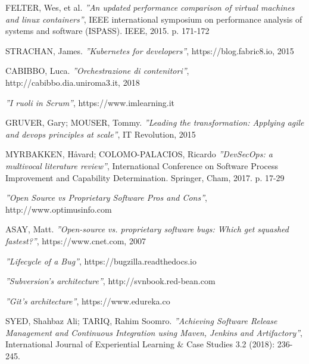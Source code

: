 \documentclass[a4paper, 12pt]{report}
\numberwithin{equation}{section}
\begin{document}
\begin{thebibliography}{9}
        FELTER, Wes, et al.
            \emph{''An updated performance comparison of virtual machines and linux containers''},
            IEEE international symposium on performance analysis of systems and software (ISPASS). IEEE, 2015. p. 171-172
            
        STRACHAN, James.
            \emph{''Kubernetes for developers''},
            https://blog.fabric8.io, 2015
            
        CABIBBO, Luca.
            \emph{''Orchestrazione di contenitori''},
            http://cabibbo.dia.uniroma3.it, 2018
            
            \emph{''I ruoli in Scrum''},
            https://www.imlearning.it
            
        GRUVER, Gary; MOUSER, Tommy.
            \emph{''Leading the transformation: Applying agile and devops principles at scale''},
            IT Revolution, 2015
            
        MYRBAKKEN, Håvard; COLOMO-PALACIOS, Ricardo
            \emph{''DevSecOps: a multivocal literature review''},
            International Conference on Software Process Improvement and Capability Determination. Springer, Cham, 2017. p. 17-29
            
            \emph{''Open Source vs Proprietary Software Pros and Cons''},
            http://www.optimusinfo.com
            
        ASAY, Matt.
            \emph{''Open-source vs. proprietary software bugs: Which get squashed fastest?''},
            https://www.cnet.com, 2007
            
            \emph{''Lifecycle of a Bug''},
            https://bugzilla.readthedocs.io
            
            \emph{''Subversion's architecture''},
            http://svnbook.red-bean.com
            
            \emph{''Git's architecture''},
            https://www.edureka.co
            
        SYED, Shahbaz Ali; TARIQ, Rahim Soomro.
            \emph{''Achieving Software Release Management and Continuous Integration using Maven, Jenkins and Artifactory''},
            International Journal of Experiential Learning & Case Studies 3.2 (2018): 236-245.
            

\end{thebibliography}
\end{document}
